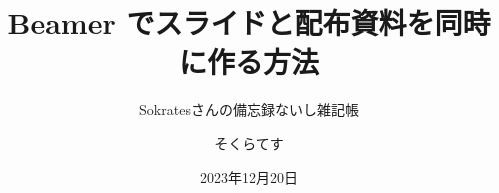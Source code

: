 \title[サンプル]{%
Beamer でスライドと配布資料を同時に作る方法
}
\author[Sokrates]{そくらてす}
\date{2023年12月20日}
\subtitle{Sokratesさんの備忘録ないし雑記帳}

